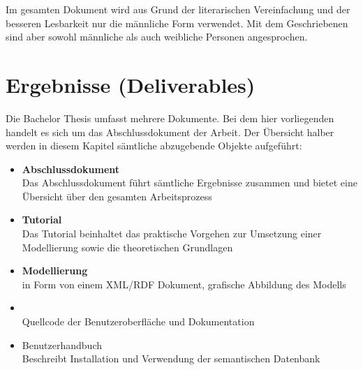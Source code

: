 Im gesamten Dokument wird aus Grund der literarischen Vereinfachung und der besseren Lesbarkeit nur die männliche Form verwendet. Mit dem Geschriebenen sind aber sowohl männliche als auch weibliche Personen angesprochen.

\section{Ergebnisse (Deliverables)}
\label{sec:admin_ergebniss}
Die Bachelor Thesis umfasst mehrere Dokumente. Bei dem hier vorliegenden handelt es sich um das Abschlussdokument der Arbeit. Der Übersicht halber werden in diesem Kapitel sämtliche abzugebende Objekte aufgeführt:
\begin{itemize}
	\item \textbf{Abschlussdokument} \\
        Das Abschlussdokument führt sämtliche Ergebnisse zusammen und bietet eine Übersicht über den gesamten Arbeitsprozess
	\item \textbf{Tutorial} \\
        Das Tutorial beinhaltet das praktische Vorgehen zur Umsetzung einer Modellierung sowie die theoretischen Grundlagen
	\item \textbf{Modellierung} \\
        in Form von einem XML/RDF Dokument, grafische Abbildung des Modells
	\item {} \\
        Quellcode der Benutzeroberfläche und Dokumentation
	\item Benutzerhandbuch \\
        Beschreibt Installation und Verwendung der semantischen Datenbank

\end{itemize}

